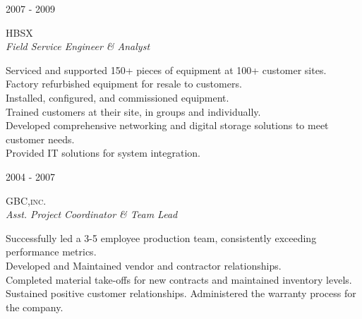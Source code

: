 \documentclass[10pt]{article} %
\begin{document}
\begin{minipage}[t]{0.5\textwidth}

{\raggedleft\textsc{2007 - 2009}\par}

{\raggedright\large\textsc{HBSX}\\
\textit{Field Service Engineer \& Analyst}\\[5pt]}

\normalsize{\textbullet Serviced and supported 150+ pieces of equipment at 100+ customer sites.\\
\textbullet Factory refurbished equipment for resale to customers.\\
\textbullet  Installed, configured, and commissioned equipment.\\
\textbullet Trained customers at their site, in groups and individually.\\
\textbullet Developed comprehensive networking and digital storage solutions to meet customer needs.\\
\textbullet Provided IT solutions for system integration.}\\


{\raggedleft\textsc{2004 - 2007}\par}

{\raggedright\large\textsc{GBC,inc.}\\
\textit{Asst. Project Coordinator \& Team Lead}\\[5pt]}

\normalsize{\textbullet Successfully led a 3-5 employee production team, consistently exceeding performance metrics.\\
\textbullet Developed and Maintained vendor and contractor relationships.\\
\textbullet Completed material take-offs for new contracts and maintained inventory levels.\\
\textbullet Sustained positive customer relationships. Administered the warranty process for the company.}\\



\end{minipage}
\end{document}
